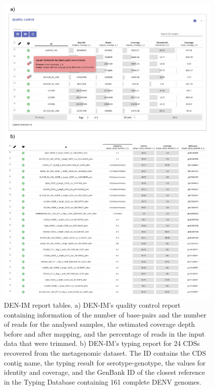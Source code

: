 \begin{figure}[h!]
\centering
\includegraphics[width=\textwidth]{figures/chapter 4/Figure S1.pdf}
\caption{DEN-IM report tables. a) DEN-IM's quality control report containing information of the number of base-pairs and the number of reads for the analysed samples, the estimated coverage depth before and after mapping, and the percentage of reads in the input data that were trimmed. b) DEN-IM's typing report for 24 CDSs recovered from the metagenomic dataset. The ID contains the CDS contig name, the typing result for serotype-genotype, the values for identity and coverage, and the GenBank ID of the closest reference in the Typing Database containing 161 complete DENV genomes.}
\label{fig:chap4_figure_sup1}
\end{figure}

